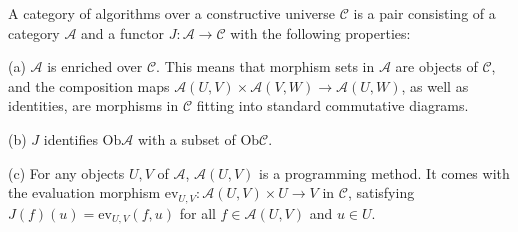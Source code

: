 A category of algorithms over a constructive universe $\mathcal{C}$ is a pair consisting of a category $\mathcal{A}$ and a functor $J : \mathcal{A} \rightarrow \mathcal{C}$ with the following properties:

(a) $\mathcal{A}$ is enriched over $\mathcal{C}$. This means that morphism sets in $\mathcal{A}$ are objects of $\mathcal{C}$, and the composition maps $\mathcal{A}(U,V) \times \mathcal{A}(V,W) \rightarrow \mathcal{A}(U,W)$, as well as identities, are morphisms in $\mathcal{C}$ fitting into standard commutative diagrams.

(b) $J$ identifies $\text{Ob}\mathcal{A}$ with a subset of $\text{Ob}\mathcal{C}$.

(c) For any objects $U,V$ of $\mathcal{A}$, $\mathcal{A}(U,V)$ is a programming method. It comes with the evaluation morphism $\text{ev}_{U,V} : \mathcal{A}(U,V) \times U \rightarrow V$ in $\mathcal{C}$, satisfying $J(f)(u) = \text{ev}_{U,V}(f,u)$ for all $f \in \mathcal{A}(U,V)$ and $u \in U$.

